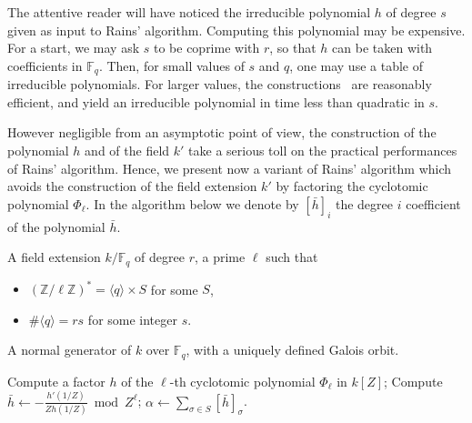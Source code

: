 \documentclass[12pt]{article}
\theoremstyle{plain}
\theoremstyle{definition}
\def\Z{\ensuremath{\mathbb{Z}}}
\def\F{\ensuremath{\mathbb{F}}}
\newcounter{algorithm}
\begin{document}
The attentive reader will have noticed the irreducible polynomial $h$
of degree $s$ given as input to Rains' algorithm. Computing this
polynomial may be expensive. For a start, we may ask $s$ to be coprime
with $r$, so that $h$ can be taken with coefficients in $\F_q$. Then,
for small values of $s$ and $q$, one may use a table of irreducible
polynomials. For larger values, the
constructions~\cite{couveignes+lercier11,DeDoSc13,DeDoSc2014}
are reasonably efficient, and yield an irreducible polynomial in time
less than quadratic in $s$.

However negligible from an asymptotic point of view, the construction
of the polynomial $h$ and of the field $k'$ take a serious toll on the
practical performances of Rains' algorithm. Hence, we present now a
variant of Rains' algorithm which avoids the construction of the field
extension $k'$ by factoring the cyclotomic polynomial $\Phi_\ell$. In
the algorithm below we denote by $[\bar{h}]_i$ the degree $i$ coefficient
of the polynomial $\bar{h}$.

\begin{algorithm}
  \label{algorithm:rains-cyclo-2}
  \begin{algorithmic}[1]
    \REQUIRE A field extension $k/\F_q$ of degree $r$, a prime $\ell$ such that
    \begin{itemize}
    \item $(\Z/\ell\Z)^\ast = \langle q\rangle \times S$ for some $S$,
    \item $\#\langle q\rangle = rs$ for some integer $s$.
    \end{itemize}
    \ENSURE A normal generator of $k$ over $\F_q$,
    with a uniquely defined Galois orbit.
    
    \STATE Compute a factor $h$ of the $\ell$-th cyclotomic polynomial $\Phi_\ell$ in $k[Z]$; 
    \STATE Compute $\bar{h} \leftarrow -\frac{h'(1/Z)}{Zh(1/Z)} \bmod Z^\ell$;
    \RETURN $\alpha \leftarrow \sum_{\sigma\in S}[\bar{h}]_\sigma$.
  \end{algorithmic}
\end{algorithm}
\end{document}
